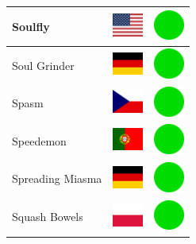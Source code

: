 \documentclass[12pt, a4paper, twoside]{report}
\begin{document}
\begin{center}
\begin{longtable}{|p{5cm}|p{2cm}|p{2cm}|}
Soulfly & \includegraphics[width=1cm]{4x3/us} & \includegraphics[width=1cm]{likes/y} \\ \hline
Soul Grinder & \includegraphics[width=1cm]{4x3/de} & \includegraphics[width=1cm]{likes/y} \\ \hline
Spasm & \includegraphics[width=1cm]{4x3/cz} & \includegraphics[width=1cm]{likes/y} \\ \hline
Speedemon & \includegraphics[width=1cm]{4x3/pt} & \includegraphics[width=1cm]{likes/y} \\ \hline
Spreading Miasma & \includegraphics[width=1cm]{4x3/de} & \includegraphics[width=1cm]{likes/y} \\ \hline
Squash Bowels & \includegraphics[width=1cm]{4x3/pl} & \includegraphics[width=1cm]{likes/y} \\ \hline

\end{longtable}
\end{center}
\end{document}
